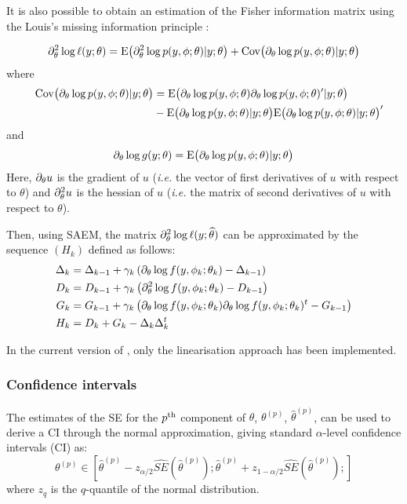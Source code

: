 It is also possible to obtain an estimation of the Fisher information matrix using the Louis's missing information principle \cite{Louis82}:

\begin{equation}\label{louis}
\partial^2_\theta \log \ell(y;\theta) = \mathrm{E}\big(\partial^2_\theta \log p(y,{\phi}; \theta) | y ; \theta \big) +
\mathrm{Cov}\big(\partial_\theta \log p(y,{\phi};\theta)| y ; \theta \big)
\end{equation}
where
\begin{align*} \quad
\mathrm{Cov}\big(\partial_\theta \log p(y,{\phi};\theta)| y ; \theta \big) &=
\mathrm{E} \big(\partial_\theta \log p(y,{\phi}; \theta) \partial_\theta \log p(y,{\phi}; \theta)^\prime |y ; \theta \big)  \\
& -
\mathrm{E} \big( \partial_\theta \log p(y,{\phi}; \theta) |y ; \theta \big)\mathrm{E} \big( \partial_\theta \log p(y,{\phi}; \theta) |y ; \theta \big)^\prime
\end{align*}
and
$$\partial_\theta \log g(y;\theta) = \mathrm{E} \big( \partial_\theta \log p(y,{\phi}; \theta) |y ; \theta \big)$$
Here, $\partial_\theta u$ is the gradient of $u$ ({\it i.e.} the vector of first derivatives of $u$ with respect to $\theta$) and  $\partial^2_\theta u$ is the hessian of $u$ ({\it i.e.} the matrix of second derivatives of $u$ with respect to $\theta$).

Then, using SAEM, the matrix $\partial^2_\theta \log \ell (y;{\widehat{\theta}})$ can be approximated by the sequence $(H_k)$ defined as follows:
\begin{align*}
\Delta_k&=\Delta_{k-1}+\gamma_k\left(\partial_{\theta}\log
f(y,\phi_k;\theta_k)-\Delta_{k-1}\right)\\
D_k  &=   D_{k-1}   +   \gamma_k  \left( \partial^2_\theta \log  f (y,  \phi_k;
    \theta_k)   - D_{k-1} \right) \\
G_k  &=   G_{k-1}   +   \gamma_k  \left(  \partial_\theta \log f(y, \phi_k; \theta_k) \partial_\theta \log f(y, \phi_k; \theta_k)^t - G_{k-1} \right) \\
H_{k} &= D_k + G_k - \Delta_k \Delta_k^t
\end{align*}

In the current version of \monolix, only the linearisation approach has been implemented.

\subsubsection{Confidence intervals}

The estimates of the SE for the $p^{\rm th}$ component of $\theta$, $\theta^{(p)}$, $\hat{\theta}^{(p)}$, can be used to derive a CI through the normal approximation, giving standard $\alpha$-level confidence intervals (CI) as:
\begin{equation} \label{eq:normalCI}
\theta^{(p)} \in \left[ \hat{\theta}^{(p)} - z_{\alpha/2} \hat{SE}(\hat{\theta}^{(p)}); \hat{\theta}^{(p)} + z_{1-\alpha/2} \hat{SE}(\hat{\theta}^{(p)});  \right]
\end{equation}
where $z_q$ is the $q$-quantile of the normal distribution. 

